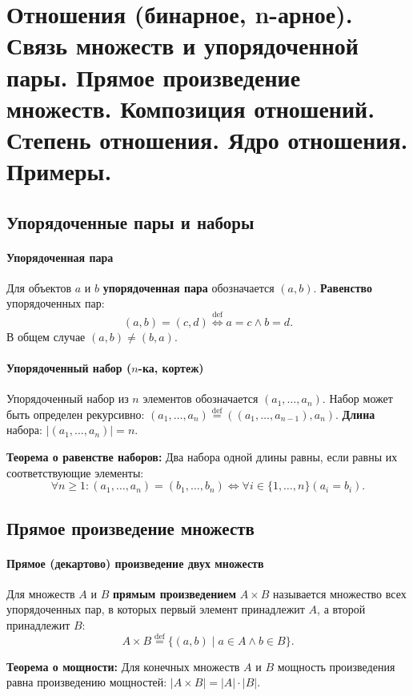 \section{Отношения (бинарное, n-арное). Связь множеств и упорядоченной пары. Прямое произведение множеств. Композиция отношений. Степень отношения. Ядро отношения. Примеры.}

\subsection*{Упорядоченные пары и наборы}

\paragraph{Упорядоченная пара}
Для объектов $a$ и $b$ \textbf{упорядоченная пара} обозначается $(a, b)$.
\textbf{Равенство} упорядоченных пар:
$$(a, b) = (c, d) \stackrel{\text{def}}{\iff} a = c \land b = d.$$
В общем случае $(a, b) \ne (b, a)$.

\paragraph{Упорядоченный набор ($n$-ка, кортеж)}
Упорядоченный набор из $n$ элементов обозначается $(a_1, \ldots, a_n)$. Набор может быть определен рекурсивно: $(a_1, \ldots, a_n) \stackrel{\text{def}}{=} ((a_1, \ldots, a_{n-1}), a_n)$.
\textbf{Длина} набора: $|(a_1, \ldots, a_n)| = n$.

\textbf{Теорема о равенстве наборов:} Два набора одной длины равны, если равны их соответствующие элементы:
$$\forall n \ge 1: (a_1, \ldots, a_n) = (b_1, \ldots, b_n) \iff \forall i \in \{1, \ldots, n\} (a_i = b_i).$$

\subsection*{Прямое произведение множеств}

\paragraph{Прямое (декартово) произведение двух множеств}
Для множеств $A$ и $B$ \textbf{прямым произведением} $A \times B$ называется множество всех упорядоченных пар, в которых первый элемент принадлежит $A$, а второй принадлежит $B$:
$$A \times B \stackrel{\text{def}}{=} \{(a, b) \mid a \in A \land b \in B\}.$$

\textbf{Теорема о мощности:} Для конечных множеств $A$ и $B$ мощность произведения равна произведению мощностей: $|A \times B| = |A| \cdot |B|$.

